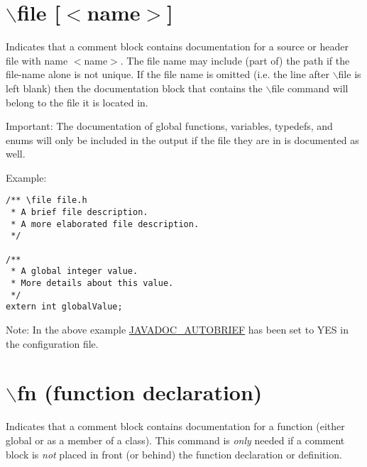  \hypertarget{commands_cmdfile}{}\section{$\backslash$file \mbox{[}$<$name$>$\mbox{]}}\label{commands_cmdfile}
 Indicates that a comment block contains documentation for a source or header file with name $<$name$>$. The file name may include (part of) the path if the file-name alone is not unique. If the file name is omitted (i.e. the line after $\backslash$file is left blank) then the documentation block that contains the $\backslash$file command will belong to the file it is located in.

\begin{Desc}
\item[Important:]The documentation of global functions, variables, typedefs, and enums will only be included in the output if the file they are in is documented as well.\end{Desc}
\begin{Desc}
\item[Example:]

\begin{VerbInclude}\begin{verbatim}/** \file file.h
 * A brief file description.
 * A more elaborated file description.
 */

/**
 * A global integer value.
 * More details about this value.
 */
extern int globalValue;
\end{verbatim}
\end{VerbInclude}
 \end{Desc}
\begin{Desc}
\item[Note:]In the above example \hyperlink{config_cfg_javadoc_autobrief}{JAVADOC\_\-AUTOBRIEF} has been set to YES in the configuration file.\end{Desc}


 \hypertarget{commands_cmdfn}{}\section{$\backslash$fn (function declaration)}\label{commands_cmdfn}
 Indicates that a comment block contains documentation for a function (either global or as a member of a class). This command is {\em only\/} needed if a comment block is {\em not\/} placed in front (or behind) the function declaration or definition.

